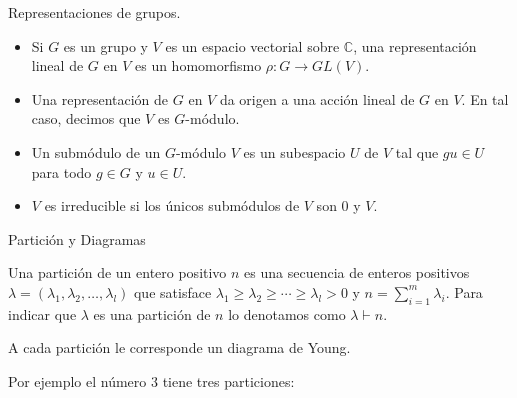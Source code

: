 \documentclass[final,xcolor=svgnames]{beamer}
\begin{document}
\begin{frame}{}
\begin{columns}
\begin{column}{0.5\textwidth}
      \begin{block}{Representaciones de grupos.}
        \begin{itemize}
          \item Si $G$ es un grupo y $V$ es un espacio vectorial sobre
            $\mathbb{C}$, una \alert{representación lineal} de $G$ en
            $V$ es un homomorfismo $\rho\colon G\rightarrow GL(V).$
          \item Una representación de $G$ en $V$ da origen a una
            acción lineal de $G$ en $V$. En tal caso, decimos que $V$ es \alert{$G$-módulo.}  
         \item Un \alert{submódulo} de un $G$-módulo $V$ es un
           subespacio $U$ de $V$ tal que $gu \in U$ para todo $g\in G$ y $u\in U$.
          \item $V$ es \alert{irreducible} si los únicos submódulos de
            $V$ son $0$ y $V$.
        \end{itemize}
      \end{block}

      \begin{block}{Partición y Diagramas}
        \begin{minipage}{0.5\linewidth}
          Una \alert{partición} de un entero positivo $n$ es una secuencia de
          enteros positivos
          $\lambda=(\lambda_{1},\lambda_{2},\ldots,\lambda_{l})$ que satisface
          $\lambda_{1}\geq\lambda_{2}\geq\cdots\geq\lambda_{l}>0$ y
          $n=\sum^{m}_{i=1}\lambda_{i}$. Para indicar que  $\lambda$ es una partición de
          $n$ lo denotamos como $\lambda\vdash n$.

          A cada partición le corresponde un \alert{diagrama de Young}.
          
          Por ejemplo el número $3$ tiene tres particiones:


\end{minipage}
\end{block}
\end{column}
\end{columns}
\end{frame}
\end{document}
